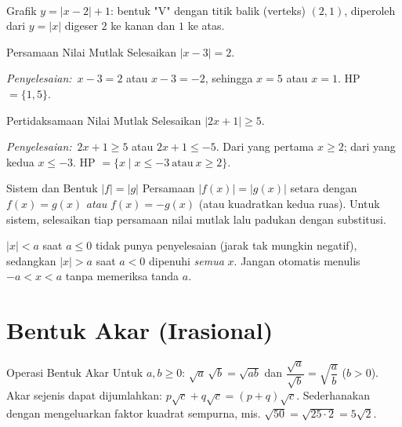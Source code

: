 \documentclass[11pt,a4paper]{report}
\theoremstyle{gaya}
\newcommand{\jawab}{\par\smallskip\noindent\textit{\textcolor{oranye}{Penyelesaian:}}\ }
\begin{document}
\begin{center}
\\
\small Grafik $y=|x-2|+1$: bentuk "V" dengan titik balik (verteks) $(2,1)$, diperoleh dari $y=|x|$ digeser $2$ ke kanan dan $1$ ke atas.
\end{center}

\begin{contoh}{Persamaan Nilai Mutlak}
Selesaikan $|x-3|=2$.

\jawab $x-3=2$ atau $x-3=-2$, sehingga $x=5$ atau $x=1$. HP $=\{1,5\}$.
\end{contoh}

\begin{contoh}{Pertidaksamaan Nilai Mutlak}
Selesaikan $|2x+1|\ge 5$.

\jawab $2x+1\ge5$ atau $2x+1\le-5$. Dari yang pertama $x\ge2$; dari yang kedua $x\le-3$. HP $=\{x\mid x\le-3\ \text{atau}\ x\ge2\}$.
\end{contoh}

\begin{konsep}{Sistem dan Bentuk $|f|=|g|$}
Persamaan $|f(x)|=|g(x)|$ setara dengan $f(x)=g(x)$ \emph{atau} $f(x)=-g(x)$ (atau kuadratkan kedua ruas). Untuk sistem, selesaikan tiap persamaan nilai mutlak lalu padukan dengan substitusi.
\end{konsep}

\begin{kesalahan}
$|x|<a$ saat $a\le0$ tidak punya penyelesaian (jarak tak mungkin negatif), sedangkan $|x|>a$ saat $a<0$ dipenuhi \emph{semua} $x$. Jangan otomatis menulis $-a<x<a$ tanpa memeriksa tanda $a$.
\end{kesalahan}

\section{Bentuk Akar (Irasional)}
\begin{konsep}{Operasi Bentuk Akar}
Untuk $a,b\ge0$: $\sqrt{a}\,\sqrt{b}=\sqrt{ab}$ dan $\dfrac{\sqrt a}{\sqrt b}=\sqrt{\dfrac ab}$ ($b>0$). Akar sejenis dapat dijumlahkan: $p\sqrt c+q\sqrt c=(p+q)\sqrt c$. Sederhanakan dengan mengeluarkan faktor kuadrat sempurna, mis. $\sqrt{50}=\sqrt{25\cdot2}=5\sqrt2$.
\end{konsep}
\end{document}
